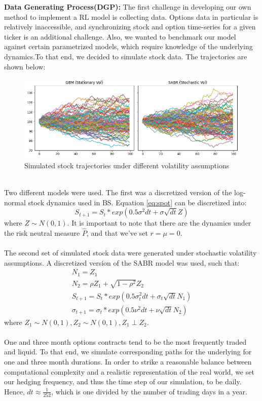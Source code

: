 \documentclass{article}
\begin{document}
\textbf{Data Generating Process(DGP):} The first challenge in developing our own method to implement a RL model is collecting data. Options data in particular is relatively inaccessible, and synchronizing stock and option time-series for a given ticker is an additional challenge. Also, we wanted to benchmark our model against certain parametrized models, which require knowledge of the underlying dynamics.To that end, we decided to simulate stock data. The trajectories are shown below:\\
\begin{figure}[h!]
    \centering
    \includegraphics[width=\linewidth]{figures/trajectories.png}
    \caption{Simulated stock trajectories under different volatility assumptions}
    \label{fig:trajectory}
\end{figure}\\
Two different models were used. The first was a discretized version of the log-normal stock dynamics used in BS. Equation  \ref{eq:spot} can be discretized into:
\begin{equation}
    S_{t+1} = S_t*exp(0.5\sigma^2dt+\sigma\sqrt{dt}Z)
\end{equation}
where $Z\sim N(0,1)$. It is important to note that there are the dynamics under the risk neutral measure $\hat{P}$, and that we've set $r = \mu = 0$.\\\\
The second set of simulated stock data were generated under stochastic volatility assumptions. A discretized version of the SABR model\cite{hagan} was used, such that:\\
\begin{align}
N_1 = Z_1\\
N_2 = \rho Z_1+\sqrt{1-\rho^2}Z_2\\
S_{t+1} = S_t*exp(0.5\sigma_t^2dt+\sigma_t\sqrt{dt}N_1)\\
\sigma_{t+1} = \sigma_t*exp(0.5\nu^2dt+\nu\sqrt{dt}N_2)
\end{align}
where $Z_1\sim N(0,1), Z_2\sim N(0,1), Z_1 \perp Z_2$.\\\\
One and three month options contracts tend to be the most frequently traded and liquid. To that end, we simulate corresponding paths for the underlying for one and three month durations. In order to strike a reasonable balance between computational complexity and a realistic representation of the real world, we set our hedging frequency, and thus the time step of our simulation, to be daily. Hence, $dt \approx \frac{1}{252}$, which is one divided by the number of trading days in a year.\\
\end{document}
